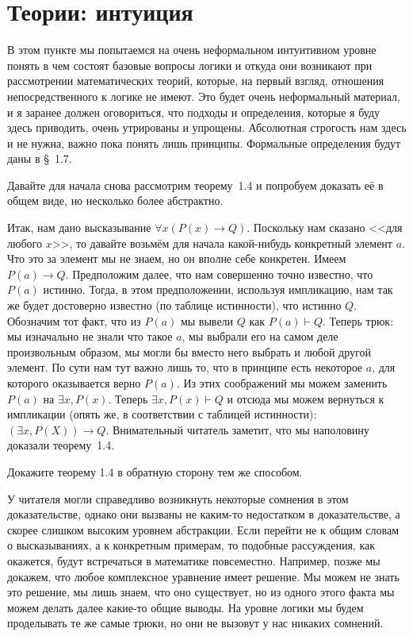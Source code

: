 \section{Теории: интуиция}

В этом пункте мы попытаемся на очень неформальном интуитивном уровне понять в чем состоят базовые вопросы логики и откуда они возникают при рассмотрении математических теорий, которые, на первый взгляд, отношения непосредственного к логике не имеют. Это будет очень неформальный материал, и я заранее должен оговориться, что подходы и определения, которые я буду здесь приводить, очень утрированы и упрощены. Абсолютная строгость нам здесь и не нужна, важно пока понять лишь принципы. Формальные определения будут даны в \S~1.7.

Давайте для начала снова рассмотрим теорему~1.4 и попробуем доказать её в общем виде, но несколько более абстрактно.

Итак, нам дано высказывание $\forall x (P(x)\to Q)$. Поскольку нам сказано <<для любого $x$>>, то давайте возьмём для начала какой-нибудь конкретный элемент $a$. Что это за элемент мы не знаем, но он вполне себе конкретен. Имеем $P(a)\to Q$. Предположим далее, что нам совершенно точно известно, что $P(a)$ истинно. Тогда, в этом предположении, используя импликацию, нам так же будет достоверно известно (по таблице истинности), что истинно $Q$. Обозначим тот факт, что из $P(a)$ мы вывели $Q$ как $P(a)\vdash Q$. Теперь трюк: мы изначально не знали что такое $a$, мы выбрали его на самом деле произвольным образом, мы могли бы вместо него выбрать и любой другой элемент. По сути нам тут важно лишь то, что  в принципе есть некоторое $a$, для которого оказывается верно $P(a)$. Из этих соображений мы можем заменить $P(a)$ на $\exists x, P(x)$. Теперь $\exists x, P(x) \vdash Q$ и отсюда мы можем вернуться к импликации (опять же, в соответствии с таблицей истинности): $(\exists x, P(X))\to Q$. Внимательный читатель заметит, что мы наполовину доказали теорему~1.4.

\begin{exercise}
Докажите теорему 1.4 в обратную сторону тем же способом.
\end{exercise}

У читателя могли справедливо возникнуть некоторые сомнения в этом доказательстве, однако они вызваны не каким-то недостатком в доказательстве, а скорее слишком высоким уровнем абстракции. Если перейти не к общим словам о высказываниях, а к конкретным примерам, то подобные рассуждения, как окажется, будут встречаться в математике повсеместно. Например, позже мы докажем, что любое комплексное уравнение имеет решение. Мы можем не знать это решение, мы лишь знаем, что оно существует, но из одного этого факта мы можем делать далее какие-то общие выводы. На уровне логики мы будем проделывать те же самые трюки, но они не вызовут у нас никаких сомнений.


